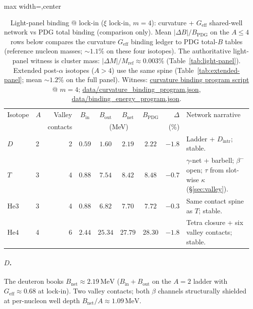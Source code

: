 \documentclass[11pt,notitlepage]{amsart}
\newcommand{\datafile}[1]{{\footnotesize\url{data/#1}}}
\newcommand{\fitbox}[1]{\begin{adjustbox}{max width=\linewidth,center}#1\end{adjustbox}}
\begin{document}
\begin{table}[h]
\centering
\caption{Light-panel binding @ lock-in ($\xi$ lock-in, $m=4$): curvature +
$G_{\mathrm{eff}}$ shared-well network vs PDG total binding (comparison only).
Mean $|\Delta B|/B_{\mathrm{PDG}}$ on the $A\le 4$ rows below compares the curvature
$G_{\mathrm{eff}}$ binding ledger to PDG total-$B$ tables (reference nucleon masses;
$\sim 1.1\%$ on these four isotopes). The authoritative light-panel witness is cluster mass:
$|\Delta M|/M_{\mathrm{ref}}\approx 0.003\%$ (Table~\ref{tab:light-panel}).
Extended post-$\alpha$ isotopes ($A>4$) use the same spine
(Table~\ref{tab:extended-panel}; mean $\sim 1.2\%$ on the full panel).
Witness: \hyperref[script:curvature-binding]{curvature binding program script}
@ $m=4$; \datafile{curvature_binding_program.json},
\datafile{binding_energy_program.json}.}
\label{tab:caustic-panel}
\fitbox{%
\footnotesize
\setlength{\tabcolsep}{3pt}
\begin{tabularx}{\linewidth}{@{}llrccccr>{\RaggedRight\arraybackslash}X@{}}
\toprule
Isotope & $A$ & Valley & $B_{\mathrm{in}}$ & $B_{\mathrm{out}}$ & $B_{\mathrm{net}}$ &
  $B_{\mathrm{PDG}}$ & $\Delta$ & Network narrative \\
& & contacts & \multicolumn{4}{c}{(MeV)} & (\%) & \\
\midrule
$D$   & 2 & 2 & $0.59$ & $1.60$ & $2.19$ & $2.22$ & $-1.8$ &
  Ladder + $D_{\mathrm{intr}}$; stable. \\
$T$   & 3 & 4 & $0.88$ & $7.54$ & $8.42$ & $8.48$ & $-0.7$ &
  $\gamma$-net + barbell; $\beta^-$ open; $\tau$ from slot-wise $\kappa$
  (\S\ref{sec:valley}). \\
$\mathrm{He3}$ & 3 & 4 & $0.88$ & $6.82$ & $7.70$ & $7.72$ & $-0.3$ &
  Same contact spine as $T$; stable. \\
$\mathrm{He4}$ & 4 & 6 & $2.44$ & $25.34$ & $27.79$ & $28.30$ & $-1.8$ &
  Tetra closure + six valley contacts; stable. \\
\bottomrule
\end{tabularx}}
\end{table}

\paragraph{$D$.}
The deuteron books $B_{\mathrm{net}}\approx 2.19\,\mathrm{MeV}$ ($B_{\mathrm{in}}+B_{\mathrm{out}}$
on the $A=2$ ladder with $G_{\mathrm{eff}}\approx 0.68$ at lock-in). Two valley contacts;
both $\beta$ channels structurally shielded at per-nucleon well depth
$B_{\mathrm{net}}/A\approx 1.09\,\mathrm{MeV}$.
\end{document}
